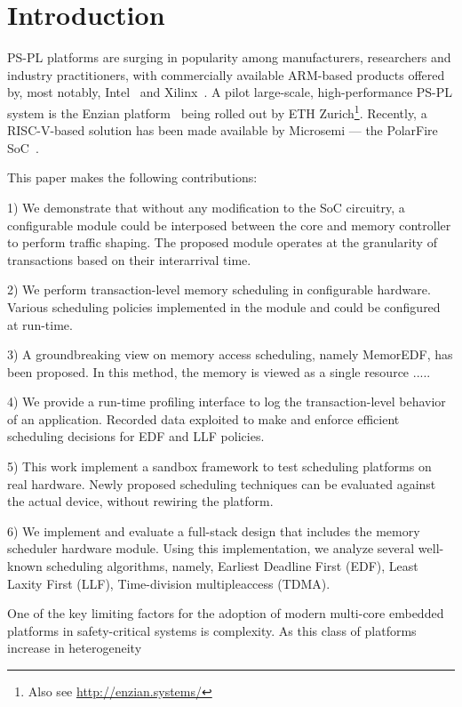 \section{Introduction}


PS-PL platforms are surging in popularity among manufacturers,
researchers and industry practitioners, with commercially available
ARM-based products offered by, most notably, Intel~\cite{stratix10}
and Xilinx~\cite{ultrascale+}. A pilot large-scale, high-performance
PS-PL system is the Enzian platform~\cite{enzian20} being rolled out
by ETH Zurich\footnote{Also see
  \url{http://enzian.systems/}}. Recently, a RISC-V-based solution has
been made available by Microsemi --- the PolarFire
SoC~\cite{icikle_kit}. 

This paper makes the following contributions:

1) We demonstrate that without any modification to the SoC circuitry,
a configurable module could be interposed between the core and memory
controller to perform traffic shaping. The proposed module operates at
the granularity of transactions based on their interarrival time.

2) We perform transaction-level memory scheduling in configurable
hardware. Various scheduling policies implemented in the module and
could be configured at run-time.

3) A groundbreaking view on memory access scheduling, namely MemorEDF,
has been proposed. In this method, the memory is viewed as a single
resource .....

4) We provide a run-time profiling interface to log the
transaction-level behavior of an application. Recorded data exploited
to make and enforce efficient scheduling decisions for EDF and LLF
policies.

5) This work implement a sandbox framework to test scheduling
platforms on real hardware. Newly proposed scheduling techniques can
be evaluated against the actual device, without rewiring the platform.

6) We implement and evaluate a full-stack design that includes the
memory scheduler hardware module. Using this implementation, we
analyze several well-known scheduling algorithms, namely, Earliest
Deadline First (EDF), Least Laxity First (LLF), Time-division
multipleaccess (TDMA).



One of the key limiting factors for the adoption of modern multi-core
embedded platforms in safety-critical systems is complexity. As this
class of platforms increase in heterogeneity
